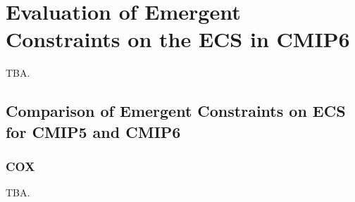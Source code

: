


\chapter{Evaluation of Emergent Constraints on the \acl{ECS} in \acs{CMIP}6}
\label{ch:05:paper_ecs}

TBA.


\section{Comparison of Emergent Constraints on \acs{ECS} for \acs{CMIP}5 and \acs{CMIP}6}
\label{sec:05:comparison_of_emergent_constraints}


\subsection{COX}
\label{subsec:05:cox}

TBA.
